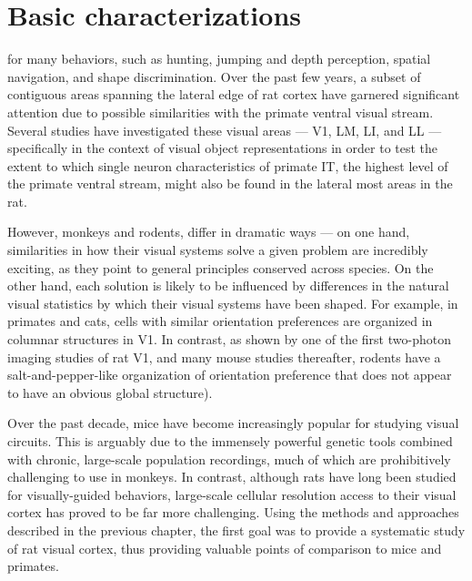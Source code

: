 
\chapter{Basic characterizations}



 for many behaviors, such as hunting, jumping and depth perception, spatial navigation, and shape discrimination. Over the past few years, a subset of contiguous areas spanning the lateral edge of rat cortex have garnered significant attention due to possible similarities with the primate ventral visual stream. Several studies \cite{Vermaercke2014, Tafazoli2017, Vinken2016} have investigated these visual areas --- V1, LM, LI, and LL --- specifically in the context of visual object representations in order to test the extent to which single neuron characteristics of primate IT, the highest level of the primate ventral stream, might also be found in the lateral most areas in the rat. 

However, monkeys and rodents, differ in dramatic ways --- on one hand, similarities in how their visual systems solve a given problem are incredibly exciting, as they point to general principles conserved across species. On the other hand, each solution is likely to be influenced by differences in the natural visual statistics by which their visual systems have been shaped. For example, in primates and cats, cells with similar orientation preferences are organized in columnar structures in V1. In contrast, as shown by one of the first two-photon imaging studies of rat V1, and many mouse studies thereafter, rodents have a salt-and-pepper-like organization of orientation preference that does not appear to have an obvious global structure\cite{Ohki2005}). 

Over the past decade, mice have become increasingly popular for studying visual circuits. This is arguably due to the immensely powerful genetic tools combined with chronic, large-scale population recordings, much of which are prohibitively challenging to use in monkeys. In contrast, although rats have long been studied for visually-guided behaviors, large-scale cellular resolution access to their visual cortex has proved to be far more challenging. Using the methods and approaches described in the previous chapter, the first goal was to provide a systematic study of rat visual cortex, thus providing valuable points of comparison to mice and primates.

